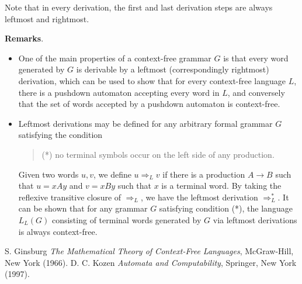 \documentclass[12pt]{article}
\begin{document}
Note that in every derivation, the first and last derivation steps are always leftmost and rightmost.

\textbf{Remarks}.  
\begin{itemize}
\item
One of the main properties of a context-free grammar $G$ is that every word generated by $G$ is derivable by a leftmost (correspondingly rightmost) derivation, which can be used to show that for every context-free language $L$, there is a pushdown automaton accepting every word in $L$, and conversely that the set of words accepted by a pushdown automaton is context-free.
\item
Leftmost derivations may be defined for any arbitrary formal grammar $G$ satisfying the condition
\begin{quote}
(*) no terminal symbols occur on the left side of any production.  
\end{quote}
Given two words $u,v$, we define $u\Rightarrow_L v$ if there is a production $A\to B$ such that $u=xAy$ and $v=xBy$ such that $x$ is a terminal word.  By taking the reflexive transitive closure of $\Rightarrow_L$, we have the leftmost derivation $\Rightarrow_L^*$.  It can be shown that for any grammar $G$ satisfying condition (*), the language $L_L(G)$ consisting of terminal words generated by $G$ via leftmost derivations is always context-free.
\end{itemize}

\begin{thebibliography}{9}
 S. Ginsburg {\em The Mathematical Theory of Context-Free Languages}, McGraw-Hill, New York (1966).
 D. C. Kozen {\em Automata and Computability}, Springer, New York (1997).
\end{thebibliography}
\end{document}
